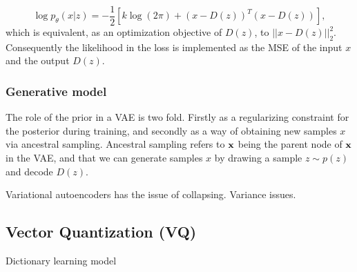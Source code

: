\documentclass[../../thesis.tex]{subfiles}
\begin{document}
\begin{equation}
    \log p_\theta(x|z) = -\frac12 \left[k\log(2\pi)+ (x-D(z))^T(x-D(z))\right],
\end{equation}
which is equivalent, as an optimization objective of $D(z)$, to $||x-D(z)||_2^2$. Consequently the likelihood in the loss is implemented as the MSE of the input $x$ and the output $D(z)$.

\subsubsection{Generative model}
The role of the prior in a VAE is two fold. Firstly as a regularizing constraint for the posterior during training, and secondly as a way of obtaining new samples $x$ via ancestral sampling. Ancestral sampling refers to $\mathbf{x}$ being the parent node of $\mathbf{x}$ in the VAE, and that we can generate samples $x$ by drawing a sample $z\sim p(z)$ and decode $D(z)$. 





Variational autoencoders has the issue of collapsing. Variance issues.


\subsection{Vector Quantization (VQ)}
Dictionary learning model \cite{Gray1984VQ}
\end{document}
